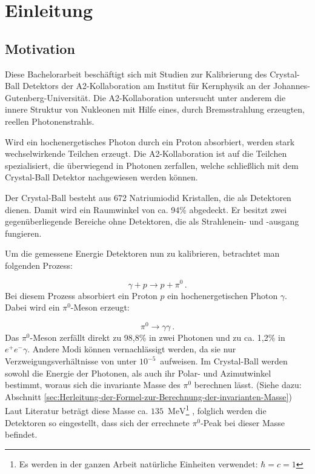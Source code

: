 \documentclass[a4paper,11pt,oneside,final,german,openbib,pdftex]{scrbook}
\begin{document}
\mainmatter
\sloppy

\chapter{Einleitung}

\section{Motivation}
{
	Diese Bachelorarbeit beschäftigt sich mit Studien zur Kalibrierung des Crystal-Ball Detektors der A2-Kollaboration am Institut für Kernphysik an der Johannes-Gutenberg-Universität.
	Die A2-Kollaboration untersucht unter anderem die innere Struktur von Nukleonen mit Hilfe eines, durch Bremsstrahlung erzeugten, reellen Photonenstrahls. 
	
	Wird ein hochenergetisches Photon durch ein Proton absorbiert, werden stark wechselwirkende Teilchen erzeugt. 
	Die A2-Kollaboration ist auf die Teilchen spezialisiert, die \"uberwiegend in Photonen zerfallen, welche schließlich mit dem Crystal-Ball Detektor nachgewiesen werden können. 
	
	Der Crystal-Ball besteht aus 672 Natriumiodid Kristallen, die als Detektoren dienen. Damit wird ein Raumwinkel von ca. 94\% abgedeckt.
	Er besitzt zwei gegen\"uberliegende Bereiche ohne Detektoren, die als Strahlenein- und -ausgang fungieren.
	
	Um die gemessene Energie Detektoren nun zu kalibrieren, betrachtet man folgenden Prozess:
	
\begin{equation}
	\gamma + p \rightarrow p + \pi^0 \,.
	\label{eq.gammascattering}
\end{equation} 
Bei diesem Prozess absorbiert ein Proton $p$ ein hochenergetischen Photon $\gamma$. Dabei wird ein $\pi^0$-Meson erzeugt:

	\begin{equation}
		\pi^0\rightarrow \gamma \gamma \,.
		\label{eq.pi0decay}
	\end{equation}
Das $\pi^0$-Meson zerfällt direkt zu 98,8\% in zwei Photonen und zu ca. 1,2\% in $e^+e^- \gamma$. Andere Modi können vernachlässigt werden, da sie nur Verzweigungsverh\"altnisse von unter $10^{-5}$\ aufweisen. Im Crystal-Ball werden sowohl die Energie der Photonen, als auch ihr Polar- und Azimutwinkel bestimmt, woraus sich die invariante Masse des $\pi^0$ berechnen lässt. (Siehe dazu: Abschnitt \ref{sec:Herleitung-der-Formel-zur-Berechnung-der-invarianten-Masse})
Laut Literatur betr\"agt diese Masse ca. $135\,\text{ MeV}$\footnote{Es werden in der ganzen Arbeit nat\"urliche Einheiten verwendet: $\hbar=c=1$} \cite{PDG16}, folglich werden die Detektoren so eingestellt, dass sich der errechnete $\pi^0$-Peak bei dieser Masse befindet. 

}
\end{document}
